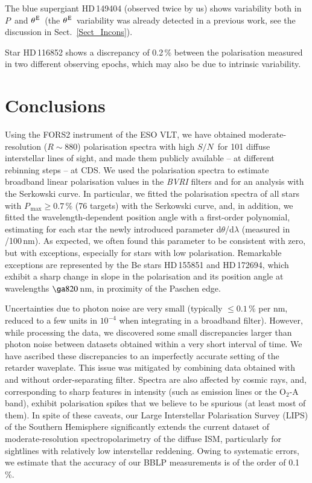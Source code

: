 \documentclass[a4paper]{aa}
\newcommand{\pl}{\ensuremath{P}}
\newcommand{\thetae}{\ensuremath{\theta^{\rm \,E}}}
\newcommand{\pmax}{\ensuremath{P_\mathrm{\,max}}}
\newcommand{\snr}{\ensuremath{S/N}}
\begin{document}
The blue supergiant HD\,149404 (observed twice by us) shows
variability both in \pl\ and \thetae\ (the \thetae\ variability was
already detected in a previous work, see the discussion in
Sect.~\ref{Sect_Incons}).

Star HD\,116852 shows a discrepancy of 0.2\,\% between the
polarisation measured in two different observing epochs, which may
also be due to intrinsic variability.


\section{Conclusions}
Using the FORS2 instrument of the ESO VLT, we have obtained moderate-resolution ($R \sim 880$) polarisation spectra with
high \snr\ for 101
diffuse interstellar lines of sight, and made them publicly available
-- at different rebinning steps -- at CDS. We used the polarisation
spectra to estimate broadband linear polarisation values in the {\it
  BVRI} filters and for an analysis with the Serkowski curve. In
particular, we fitted the polarisation
spectra of all stars with $\pmax \ge 0.7$\,\% (76 targets) with
the Serkowski curve,
and, in addition, we fitted the wavelength-dependent position angle
with a first-order polynomial, estimating for each star the newly
introduced parameter d$\theta$/d$\lambda$ (measured in
\degr/100\,nm). As expected, we often found this parameter to be
consistent with zero, but with exceptions, especially for stars with
low polarisation. Remarkable exceptions are represented by the
Be stars
HD\,155851 and HD\,172694, which exhibit a sharp change in slope in
the polarisation and its position angle at wavelengths $\ga 820$\,nm,
in proximity of the Paschen edge.

Uncertainties due to photon noise are very small (typically $\le 0.1$\,\%
per nm, reduced to a few units in $10^{-4}$ when integrating in a
broadband filter). However, while processing the data, we discovered
some small discrepancies larger than photon noise between datasets
obtained within a very short interval of time. We have ascribed these
discrepancies to an imperfectly accurate
setting of the retarder waveplate. This issue was mitigated by
combining data obtained with and without order-separating filter.
Spectra are also affected by cosmic rays, and, corresponding to sharp
features in intensity (such as emission lines or the O$_2$-A band),
exhibit polarisation spikes that we believe to be spurious (at least
most of them). In spite of these caveats, our Large Interstellar
Polarisation Survey (LIPS) of the Southern Hemisphere significantly
extends the current dataset of moderate-resolution spectropolarimetry
of the diffuse ISM, particularly for sightlines with relatively low
interstellar reddening. Owing to systematic errors, we estimate that the
accuracy of our BBLP measurements is of the order of 0.1\,\%.
\end{document}
